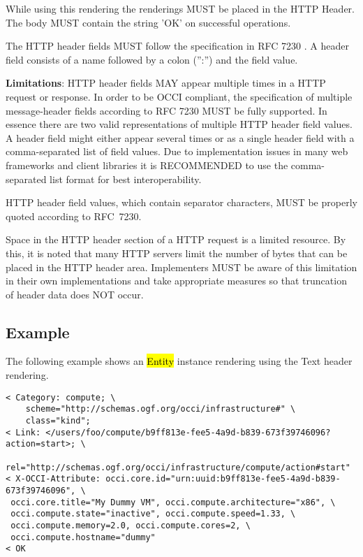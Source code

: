 \documentclass[10pt,a4paper]{article}
\begin{document}
While using this rendering the renderings MUST be placed in the HTTP Header. The body MUST contain the string ’OK’ on successful operations.

The HTTP header fields MUST follow the specification in RFC 7230 \cite{rfc7230}. A header field consists of a name followed by a colon (”:”) and the field value.

\textbf{Limitations}: HTTP header fields MAY appear multiple times in a HTTP request or response. In order to be OCCI compliant, the specification of multiple message-header fields according to RFC 7230 MUST be fully supported. In essence there are two valid representations of multiple HTTP header field values. A header field might either appear several times or as a single header field with a comma-separated list of field values. Due to implementation issues in many web frameworks and client libraries it is RECOMMENDED to use the comma-separated list format for best interoperability.

HTTP header field values, which contain separator characters, MUST be properly quoted according to RFC~7230.

Space in the HTTP header section of a HTTP request is a limited resource. By this, it is noted that many HTTP servers limit the number of bytes that can be placed in the HTTP header area. Implementers MUST be aware of this limitation in their own implementations and take appropriate measures so that truncation of header data does NOT occur.

\subsection{Example}

The following example shows an \hl{Entity} instance rendering using the Text header rendering.

\begin{verbatim}
< Category: compute; \
    scheme="http://schemas.ogf.org/occi/infrastructure#" \
    class="kind";
< Link: </users/foo/compute/b9ff813e-fee5-4a9d-b839-673f39746096?action=start>; \
    rel="http://schemas.ogf.org/occi/infrastructure/compute/action#start"
< X-OCCI-Attribute: occi.core.id="urn:uuid:b9ff813e-fee5-4a9d-b839-673f39746096", \
 occi.core.title="My Dummy VM", occi.compute.architecture="x86", \
 occi.compute.state="inactive", occi.compute.speed=1.33, \
 occi.compute.memory=2.0, occi.compute.cores=2, \
 occi.compute.hostname="dummy"
< OK
\end{verbatim}
\end{document}
